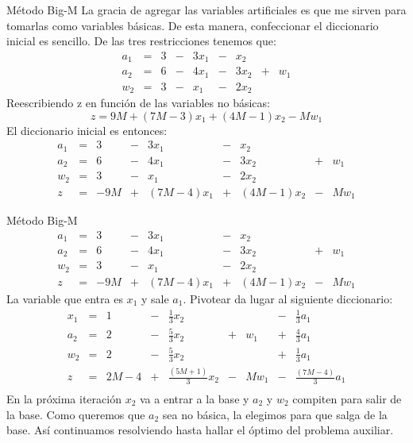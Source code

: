 \documentclass[10pt, aspectratio=169]{beamer}
\begin{document}
    \begin{frame}{Método Big-M}
        La gracia de agregar las variables artificiales es que me sirven para tomarlas como variables básicas. De esta
        manera, confeccionar el diccionario inicial es sencillo.
        De las tres restricciones tenemos que:
        \[
            \begin{array}{rrrrrrrrr}
                a_1 & = & 3 & - & 3x_1 & - & x_2 \\
                a_2 & = & 6 & - & 4x_1 & - & 3x_2 & + & w_1 \\
                w_2 & = & 3 & - & x_1 & - & 2x_2
            \end{array}
        \]
        Reescribiendo z en función de las variables no básicas:
        \[ z= 9M + (7M-3)x_1+(4M-1)x_2-Mw_1 \]
        El diccionario inicial es entonces:
        \[
            \begin{array}{rrrrrrrrr}
                a_1 & = & 3 & - & 3x_1 & - & x_2 \\
                a_2 & = & 6   & - & 4x_1      & - & 3x_2      & + & w_1  \\
                w_2 & = & 3 & - & x_1 & - & 2x_2 \\ \hline
                z   & = & -9M & + & (7M-4)x_1 & + & (4M-1)x_2 & - & Mw_1
            \end{array}
        \]
    \end{frame}

    \begin{frame}{Método Big-M}
        \[
            \begin{array}{rrrrrrrrr}
                a_1 & = & 3 & - & 3x_1 & - & x_2 \\
                a_2 & = & 6   & - & 4x_1      & - & 3x_2      & + & w_1  \\
                w_2 & = & 3 & - & x_1 & - & 2x_2 \\ \hline
                z   & = & -9M & + & (7M-4)x_1 & + & (4M-1)x_2 & - & Mw_1
            \end{array}
        \]
        La variable que entra es $x_1$ y sale $a_1$. Pivotear da lugar al siguiente diccionario:
        \[
            \begin{array}{rrrrrrrrr}
                x_1 & = & 1    & - & \frac{1}{3}x_2      &   &      & - & \frac{1}{3}a_1      \\
                a_2 & = & 2    & - & \frac{5}{3}x_2      & + & w_1  & + & \frac{4}{3}a_1      \\
                w_2 & = & 2    & - & \frac{5}{3}x_2      &   &      & + & \frac{1}{3}a_1      \\ \hline
                z   & = & 2M-4 & + & \frac{(5M+1)}{3}x_2 & - & Mw_1 & - & \frac{(7M-4)}{3}a_1 \\
            \end{array}
        \]
        En la próxima iteración $x_2$ va a entrar a la base y $a_2$ y $w_2$
        compiten para salir de la base. Como queremos que $a_2$
        sea no básica, la elegimos para que salga de la base. Así continuamos resolviendo hasta hallar el óptimo del
        problema auxiliar.
    \end{frame}
\end{document}

